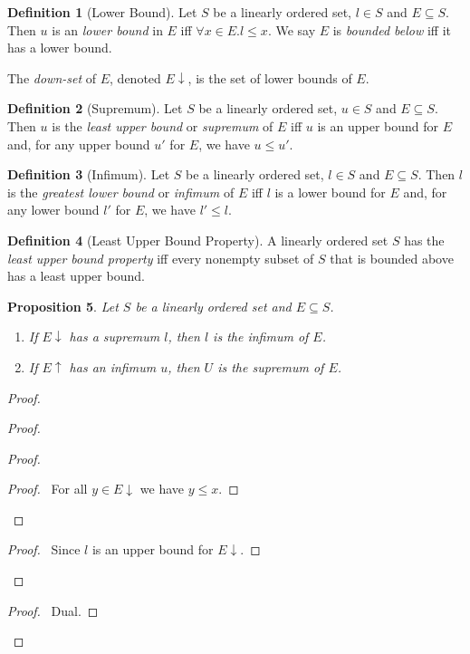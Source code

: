 \documentclass{book}
\let\qed\relax
\newtheorem{prop}{Proposition}[chapter]
\theoremstyle{definition}
\newtheorem{df}[prop]{Definition}
\begin{document}
\begin{df}[Lower Bound]
Let $S$ be a linearly ordered set, $l \in S$ and $E \subseteq S$. Then $u$ is an \emph{lower bound} in $E$ iff $\forall x \in E. l \leq x$. We say $E$ is \emph{bounded below} iff it has a lower bound.

The \emph{down-set} of $E$, denoted $E \downarrow$, is the set of lower bounds of $E$.
\end{df}

\begin{df}[Supremum]
Let $S$ be a linearly ordered set, $u \in S$ and $E \subseteq S$. Then $u$ is the \emph{least upper bound} or \emph{supremum} of $E$ iff $u$ is an upper bound for $E$ and, for any upper bound $u'$ for $E$, we have $u \leq u'$.
\end{df}

\begin{df}[Infimum]
Let $S$ be a linearly ordered set, $l \in S$ and $E \subseteq S$. Then $l$ is the \emph{greatest lower bound} or \emph{infimum} of $E$ iff $l$ is a lower bound for $E$ and, for any lower bound $l'$ for $E$, we have $l' \leq l$.
\end{df}

\begin{df}[Least Upper Bound Property]
A linearly ordered set $S$ has the \emph{least upper bound property} iff every nonempty subset of $S$ that is bounded above has a least upper bound.
\end{df}

\begin{prop}
Let $S$ be a linearly ordered set and $E \subseteq S$.
\begin{enumerate}
\item If $E \downarrow$ has a supremum $l$, then $l$ is the infimum of $E$.
\item If $E \uparrow$ has an infimum $u$, then $U$ is the supremum of $E$.
\end{enumerate}
\end{prop}

\begin{proof}
\pf
{}
\begin{proof}
	\begin{proof}
		\begin{proof}
			\pf\ For all $y \in E \downarrow$ we have $y \leq x$.
		\end{proof}
	\end{proof}
	\begin{proof}
		\pf\ Since $l$ is an upper bound for $E \downarrow$.
	\end{proof}
\end{proof}
\begin{proof}
	\pf\ Dual.
\end{proof}
\qed
\end{proof}
\end{document}
